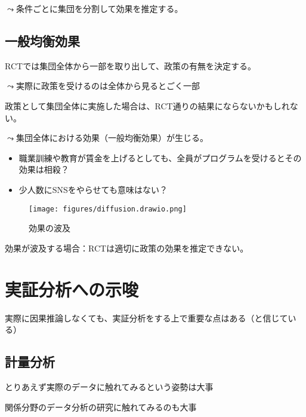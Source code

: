 \documentclass[
  xelatex,
  ja=standard]{bxjsarticle}
\providecommand{\tightlist}{%
  \setlength{\itemsep}{0pt}\setlength{\parskip}{0pt}}\usepackage{longtable,booktabs,array}
\begin{document}
\(\leadsto\)条件ごとに集団を分割して効果を推定する。

\hypertarget{ux4e00ux822cux5747ux8861ux52b9ux679c}{%
\subsection{一般均衡効果}\label{ux4e00ux822cux5747ux8861ux52b9ux679c}}

RCTでは集団全体から一部を取り出して、政策の有無を決定する。

\(\leadsto\)実際に政策を受けるのは全体から見るとごく一部

政策として集団全体に実施した場合は、RCT通りの結果にならないかもしれない。

\(\leadsto\)集団全体における効果（一般均衡効果）が生じる。

\begin{itemize}
\tightlist
\item
  職業訓練や教育が賃金を上げるとしても、全員がプログラムを受けるとその効果は相殺？
\item
  少人数にSNSをやらせても意味はない？
\end{itemize}

\begin{figure}[htpb]

{\centering \texttt{[image: figures/diffusion.drawio.png]}

}

\caption{効果の波及}

\end{figure}

効果が波及する場合：RCTは適切に政策の効果を推定できない。

\hypertarget{ux5b9fux8a3cux5206ux6790ux3078ux306eux793aux5506}{%
\section{実証分析への示唆}\label{ux5b9fux8a3cux5206ux6790ux3078ux306eux793aux5506}}

実際に因果推論しなくても、実証分析をする上で重要な点はある（と信じている）

\hypertarget{ux8a08ux91cfux5206ux6790}{%
\subsection{計量分析}\label{ux8a08ux91cfux5206ux6790}}

とりあえず実際のデータに触れてみるという姿勢は大事

関係分野のデータ分析の研究に触れてみるのも大事
\end{document}
